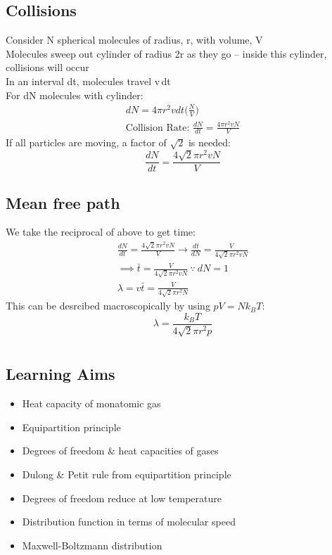 \documentclass[a4paper, 11pt, normalem]{report}
\begin{document}
\section{Collisions}
Consider N spherical molecules of radius, r, with volume, V \\
Molecules sweep out cylinder of radius 2r as they go -- inside this cylinder, collisions will occur \\
In an interval dt, molecules travel v{\,}dt \\
For dN molecules with cylinder:
\begin{gather*}
	dN = 4{\pi}r^{2}vdt\Big(\frac{N}{V}\Big) \\
	\text{Collision Rate: } \frac{dN}{dt} = \frac{4{\pi}r^{2}vN}{V}
\end{gather*}
If all particles are moving, a factor of $\sqrt{2}$ is needed:
\begin{equation*}
	\frac{dN}{dt} = \frac{4\sqrt{2}{\pi}r^{2}vN}{V}
\end{equation*}

\section{Mean free path}
We take the reciprocal of above to get time:
\begin{gather*}
	\frac{dN}{dt} = \frac{4\sqrt{2}{\pi}r^{2}vN}{V} \rightarrow \frac{dt}{dN} = \frac{V}{4\sqrt{2}{\pi}r^{2}vN} \\
	\implies \bar{t} = \frac{V}{4\sqrt{2}{\pi}r^{2}vN} ~\because~ dN = 1 \\
	\lambda = v\bar{t} = \frac{V}{4\sqrt{2}{\pi}r^{2}N}
\end{gather*}
This can be desrcibed macroscopically by using $pV = Nk_{B}T$:
\begin{equation*}
	\lambda = \frac{k_{B}T}{4\sqrt{2}{\pi}r^{2}p}
\end{equation*}

\chapter{}
\thispagestyle{fancy}
\section{Learning Aims}
\begin{itemize}
	\item Heat capacity of monatomic gas
	\item Equipartition principle
	\item Degrees of freedom \& heat capacities of gases
	\item Dulong \& Petit rule from equipartition principle
	\item Degrees of freedom reduce at low temperature
	\item Distribution function in terms of molecular speed
	\item Maxwell-Boltzmann distribution
\end{itemize}
\end{document}
